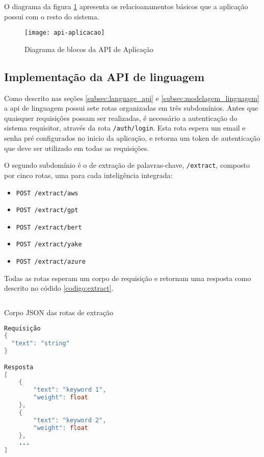 O diagrama da figura \ref{fig:api_aplicacao} apresenta os relacioanamentos básicos que a aplicação possui com o resto do sistema.

\begin{figure}[H]
  \caption{Diagrama de blocos da API de Aplicação}
  \texttt{[image: api-aplicacao]}
  \label{fig:api_aplicacao}
\end{figure}

\subsection{Implementação da API de linguagem}\label{subsec:api-linguagens}

Como descrito nas seções \ref{subsec:language_api} e \ref{subsec:modelagem_linguagem} a \gls{api} de linguagem possui sete rotas organizadas em três subdomínios. Antes que quaisquer requisições possam ser realizadas, é necessário a autenticação do sistema requisitor, através da rota \texttt{/auth/login}. Esta rota espera um email e senha pré configurados no inicio da aplicação, e retorna um token de autenticação que deve ser utilizado em todas as requisições.

O segundo subdomínio é o de extração de palavras-chave, \texttt{/extract}, composto por cinco rotas, uma para cada inteligência integrada:

\begin{itemize}
  \item \texttt{POST /extract/aws}
  \item \texttt{POST /extract/gpt}
  \item \texttt{POST /extract/bert}
  \item \texttt{POST /extract/yake}
  \item \texttt{POST /extract/azure}
\end{itemize}

Todas as rotas esperam um corpo de requisição e retornam uma resposta como descrito no códido \ref{codigo:extract}.

\begin{sourcecode}[H]
  \caption{\label{codigo:extract}Corpo JSON das rotas de extração}
  \begin{lstlisting}[frame=single, language=Java]
Requisição
{
  "text": "string"
}

Resposta
[
	{
		"text": "keyword 1",
		"weight": float
	},
	{
		"text": "keyword 2",
		"weight": float
	},
	...
]
\end{lstlisting}
  \fonte{}
\end{sourcecode}

